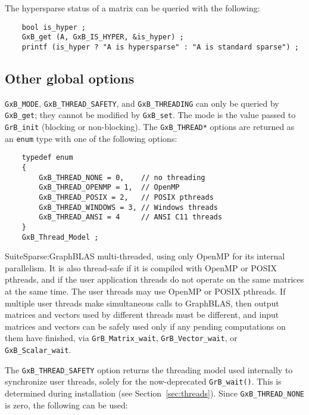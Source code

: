 \documentclass[12pt]{article}
\begin{document}
The hypersparse status of a matrix can be queried with the following:

{\footnotesize
\begin{verbatim}
    bool is_hyper ;
    GxB_get (A, GxB_IS_HYPER, &is_hyper) ;
    printf (is_hyper ? "A is hypersparse" : "A is standard sparse") ; \end{verbatim}}

\subsection{Other global options}

\verb'GxB_MODE', \verb'GxB_THREAD_SAFETY', and \verb'GxB_THREADING' can only be
queried by \verb'GxB_get'; they cannot be modified by \verb'GxB_set'.  The mode
is the value passed to \verb'GrB_init' (blocking or non-blocking).  The
\verb'GxB_THREAD*' options are returned as an \verb'enum' type with one of the
following options:

{\footnotesize
\begin{verbatim}
    typedef enum
    {
        GxB_THREAD_NONE = 0,    // no threading
        GxB_THREAD_OPENMP = 1,  // OpenMP
        GxB_THREAD_POSIX = 2,   // POSIX pthreads
        GxB_THREAD_WINDOWS = 3, // Windows threads
        GxB_THREAD_ANSI = 4     // ANSI C11 threads
    }
    GxB_Thread_Model ; \end{verbatim} }

SuiteSparse:GraphBLAS multi-threaded, using only OpenMP for its internal
parallelism.  It is also thread-safe if it is compiled with OpenMP or POSIX
pthreads, and if the user application threads do not operate on the same
matrices at the same time.  The user threads may use OpenMP or POSIX pthreads.
If multiple user threads make simultaneous calls to GraphBLAS, then output
matrices and vectors used by different threads must be different, and input
matrices and vectors can be safely used only if any pending computations on
them have finished, via \verb'GrB_Matrix_wait', \verb'GrB_Vector_wait', or
\verb'GxB_Scalar_wait'.

The \verb'GxB_THREAD_SAFETY' option returns the threading model used internally
to synchronize user threads, solely for the now-deprecated \verb'GrB_wait()'.
This is determined during installation (see Section~\ref{sec:threads}).  Since
\verb'GxB_THREAD_NONE' is zero, the following can be used:
\end{document}
